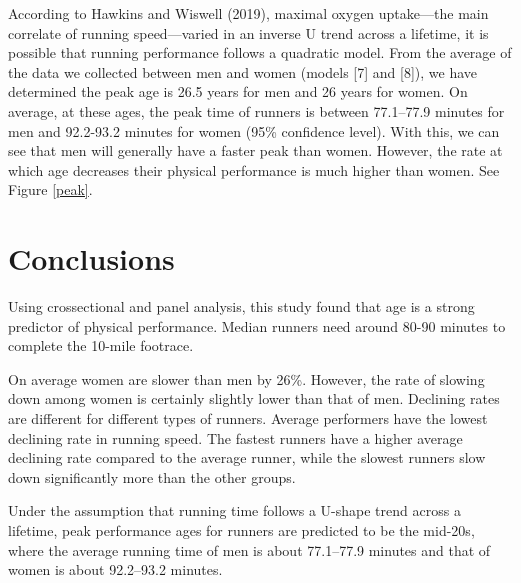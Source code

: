 \documentclass[12pt]{article}
\begin{document}


According to Hawkins and Wiswell (2019), maximal oxygen uptake---the main
correlate of running speed---varied in an inverse U trend across a lifetime,
it is possible that running performance follows a quadratic model.
From the average of the data we collected between men and women
(models [7] and [8]),
we have determined the peak age is 26.5 years for men and 26 years for women.
On average, at these ages, the peak time of runners is between 77.1--77.9
minutes for men and 92.2-93.2 minutes for women (95\% confidence level).
With this, we can see that men will generally have a faster peak than women. However, the rate at which age decreases their physical performance is much higher than women.
See Figure \ref{peak}.


\section*{Conclusions}

Using crossectional and panel analysis, this study found that age is a
strong predictor of physical performance.
Median runners need around 80-90 minutes to complete the 10-mile footrace.

On average women are slower than men by 26\%.
However, the rate of slowing down among women is certainly slightly lower
than that of men. Declining rates are different for different types of runners.
Average performers have the lowest declining rate in running speed.
The fastest runners have a higher average declining rate compared to the
average runner, while the slowest runners slow down significantly more than
the other groups.

Under the assumption that running time follows a U-shape trend across a
lifetime, peak performance ages for runners are predicted to be the mid-20s,
where the average running time of men is about 77.1--77.9 minutes and that of
women is about 92.2--93.2 minutes.
\end{document}
